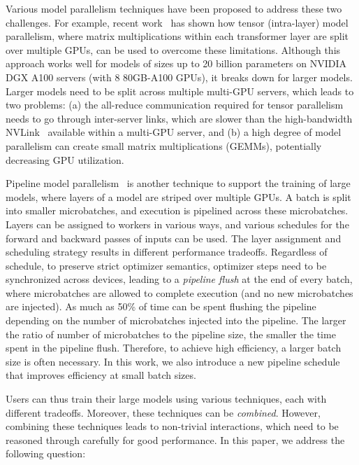 Various model parallelism techniques have been proposed to address these two challenges. For example, recent work~\cite{mesh_tf,shoeybi2019megatron} has shown how tensor (intra-layer) model parallelism, where matrix multiplications within each transformer layer are split over multiple GPUs, can be used to overcome these limitations. Although this approach works well for models of sizes up to 20 billion parameters on NVIDIA DGX A100 servers (with 8 80GB-A100 GPUs), it breaks down for larger models. Larger models need to be split across multiple multi-GPU servers, which leads to two problems: (a) the all-reduce communication required for tensor parallelism needs to go through inter-server links, which are slower than the high-bandwidth NVLink~\cite{nvlink} available within a multi-GPU server, and (b) a high degree of model parallelism can create small matrix multiplications (GEMMs), potentially decreasing GPU utilization.

Pipeline model parallelism~\cite{narayanan2019pipedream, huang2019gpipe,narayanan2021memory, yang2021pipemare, pb2021kosson, fan2021dapple} is another technique to support the training of large models, where layers of a model are striped over multiple GPUs. A batch is split into smaller microbatches, and execution is pipelined across these microbatches. Layers can be assigned to workers in various ways, and various schedules for the forward and backward passes of inputs can be used. The layer assignment and scheduling strategy results in different performance tradeoffs. Regardless of schedule, to preserve strict optimizer semantics, optimizer steps need to be synchronized across devices, leading to a \emph{pipeline flush} at the end of every batch, where microbatches are allowed to complete execution (and no new microbatches are injected). As much as 50\% of time can be spent flushing the pipeline depending on the number of microbatches injected into the pipeline. The larger the ratio of number of microbatches to the pipeline size, the smaller the time spent in the pipeline flush. Therefore, to achieve high efficiency, a larger batch size is often necessary. In this work, we also introduce a new pipeline schedule that improves efficiency at small batch sizes.

Users can thus train their large models using various techniques, each with different tradeoffs. Moreover, these techniques can be \emph{combined}. However, combining these techniques leads to non-trivial interactions, which need to be reasoned through carefully for good performance. In this paper, we address the following question:


